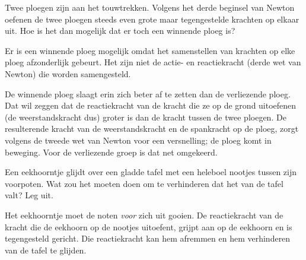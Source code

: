 \documentclass{ximera}
\begin{document}
\begin{exercise}
	Twee ploegen zijn aan het touwtrekken. Volgens het derde beginsel van Newton oefenen de twee ploegen steeds even grote maar tegengestelde krachten op elkaar uit. Hoe is het dan mogelijk dat er toch een winnende ploeg is?
	\begin{oplossing}
		Er is een winnende ploeg mogelijk omdat het samenstellen van krachten op elke ploeg afzonderlijk gebeurt. Het zijn niet de actie- en reactiekracht (derde wet van Newton) die worden samengesteld. 
		
		De winnende ploeg slaagt erin zich beter af te zetten dan de verliezende ploeg. Dat wil zeggen dat de reactiekracht van de kracht die ze op de grond uitoefenen (de weerstandskracht dus) groter is dan de kracht tussen de twee ploegen. De resulterende kracht van de weerstandskracht en de spankracht op de ploeg, zorgt volgens de tweede wet van Newton voor een versnelling; de ploeg komt in beweging. Voor de verliezende groep is dat net omgekeerd.
	\end{oplossing}
\end{exercise}

\begin{exercise}
	Een eekhoorntje glijdt over een gladde tafel met een heleboel nootjes tussen zijn voorpoten. Wat zou het moeten doen om te verhinderen dat het van de tafel valt? Leg uit.
	
	\begin{oplossing}
		Het eekhoorntje moet de noten \emph{voor} zich uit gooien. De reactiekracht van de kracht die de eekhoorn op de nootjes uitoefent, grijpt aan op de eekhoorn en is tegengesteld gericht. Die reactiekracht kan hem afremmen en hem verhinderen van de tafel te glijden.
	\end{oplossing}
\end{exercise}
\end{document}
